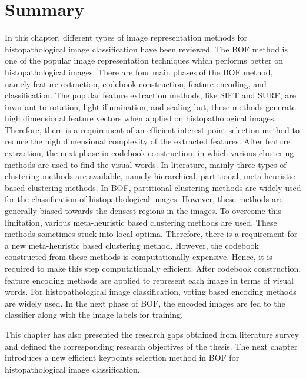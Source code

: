 \section{Summary}\label{Ch2:sec:Summary}
In this chapter, different types of image representation methods for histopathological image classification have been reviewed. The BOF method is one of the popular image representation techniques which performs better on histopathological images. There are four main phases of the BOF method, namely feature extraction, codebook construction, feature encoding, and classification.  The popular feature extraction methods, like SIFT and SURF, are invariant to rotation, light illumination, and scaling but, these methods generate high dimensional feature vectors when applied on histopathological images. Therefore, there is a requirement of an efficient interest point selection method to reduce the high dimensional complexity of the extracted features. After feature extraction, the next phase in codebook construction, in which various clustering methods are used to find the visual words. In literature, mainly three types of clustering methods are available, namely hierarchical, partitional, meta-heuristic based clustering methods. In BOF, partitional clustering methods are widely used for the classification of histopathological images. However, these methods are generally biased towards the densest regions in the images. To overcome this limitation, various meta-heuristic based clustering methods are used. These methods sometimes stuck into local optima. Therefore, there is a requirement for a new meta-heuristic based clustering method. However, the codebook constructed from these methods is computationally expensive. Hence, it is required to make this step computationally efficient. After codebook construction, feature encoding methods are applied to represent each image in terms of visual words. For histopathological image classification, voting based encoding methods are widely used. In the next phase of BOF, the encoded images are fed to the classifier along with the image labels for training. 

This chapter has also presented the research gaps obtained from literature survey and defined the corresponding research objectives of the thesis. The next chapter introduces a new efficient keypoints selection method in BOF for histopathological image classification. 
